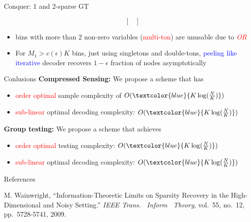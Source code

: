 \documentclass[final]{beamer}
\newlength{\threecolwid}
\newlength{\blockskip}
\newlength{\paraskip}
\begin{document}
\begin{frame}
\begin{columns}[t]
\begin{column}{\threecolwid}
\begin{block}{\Large Conquer: 1 and 2-sparse GT}
\begin{itemize}
\begin{equation*}
\begin{bmatrix}
				    \end{bmatrix}
		        \end{equation*}
		      \item bins with more than 2 non-zero variables (\textcolor{red}{multi-ton}) are unusable due to \textcolor{red}{\textit{OR}}
		      \item For $M_1>c(\epsilon)K$ bins, just using singletons and double-tons, \textcolor{blue}{peeling like iterative} decoder recovers $1-\epsilon$ fraction of nodes asymptotically
    	\end{itemize}
    \end{block}      
\vspace{\blockskip}    

%    
      

         \begin{alertblock}{\Large Conlusions} 
	    \textbf{Compressed Sensing:} We propose a scheme that has
			\begin{itemize}
			\itemsep10pt
				\item \textcolor{red}{order optimal} sample complexity of $O(\textcolor{blue}{K\log (\frac{N}{K})})$
				\item \textcolor{red}{sub-linear} optimal decoding complexity: $O(\textcolor{blue}{K\log (\frac{N}{K})})$
			\end{itemize} 
\vspace{\paraskip}    
  
   \textbf{Group testing:} We propose a scheme that achieves
		\begin{itemize}
		\itemsep10pt
			\item \textcolor{red}{order optimal} testing complexity: $O(\textcolor{blue}{K\log (\frac{N}{K})})$
			\item \textcolor{red}{sub-linear} optimal decoding complexity: $O(\textcolor{blue}{K\log (\frac{N}{K})})$
		\end{itemize} 
    \end{alertblock}
\vspace{\blockskip}    

    \vspace{2.5cm}
    \begin{block}{References}
      \begin{thebibliography}{10}
M. Wainwright, ``Information-Theoretic Limits on Sparsity Recovery in the High-Dimensional and Noisy Setting.'' \emph{IEEE Trans. \ Inform \ Theory}, vol.~55, no.~12, pp.~5728-5741, 2009.


\end{thebibliography}
\end{block}
\end{column}
\end{columns}
\end{frame}
\end{document}
